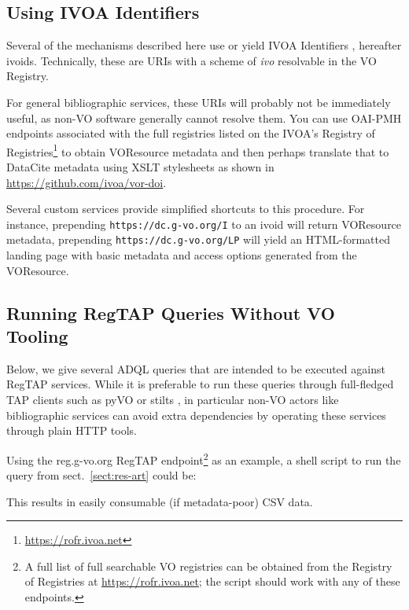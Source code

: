 \documentclass[11pt,a4paper]{ivoa}
\begin{document}
\subsection{Using IVOA Identifiers}
\label{sect:use-ivoid}

Several of the mechanisms described here use or yield IVOA Identifiers
\citep{2016ivoa.spec.0523D}, hereafter ivoids.  Technically, these are
URIs with a scheme of \textit{ivo} resolvable in the VO Registry.

For general bibliographic services, these URIs will probably not be
immediately useful, as non-VO software generally cannot resolve them.
You can use OAI-PMH endpoints associated with the full registries listed
on the IVOA's Registry of
Registries\footnote{\url{https://rofr.ivoa.net}} to obtain VOResource
metadata and then perhaps translate that to DataCite metadata using XSLT
stylesheets as shown in \url{https://github.com/ivoa/vor-doi}.

Several custom services provide simplified shortcuts to this procedure.
For instance, prepending \verb|https://dc.g-vo.org/I| to an ivoid will
return VOResource metadata, prepending \verb|https://dc.g-vo.org/LP|
will yield an HTML-formatted landing page with basic metadata and access
options generated from the VOResource.

\subsection{Running RegTAP Queries Without VO Tooling}
\label{sect:regtap}

Below, we give several ADQL queries that are intended to be executed
against RegTAP services.  While it is preferable to run these queries
through full-fledged TAP \citep{2019ivoa.spec.0927D} clients such as
pyVO \citep{2014ascl.soft02004G} or stilts \citep{2006ASPC..351..666T},
in particular non-VO actors like bibliographic services can avoid extra
dependencies by operating these services through plain HTTP tools.

Using the reg.g-vo.org RegTAP endpoint\footnote{A full list
of full searchable VO registries can be obtained from the Registry of
Registries at \url{https://rofr.ivoa.net}; the script should work with
any of these endpoints.} as an example, a shell script to run the query
from sect.~\ref{sect:res-art} could be:



This results in easily consumable (if metadata-poor) CSV data.
\end{document}

